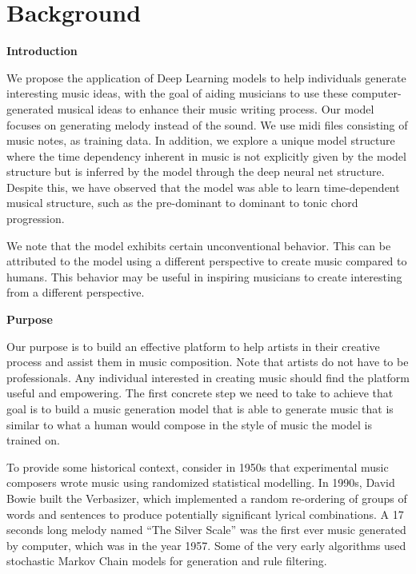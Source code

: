 \documentclass[12pt,oneside]{chicagocapstone}
\begin{document}
\hypertarget{background}{%
\chapter*{Background}\label{background}}

\textbf{Introduction}

We propose the application of Deep Learning models to help individuals generate interesting music ideas, with the goal of aiding musicians to use these computer-generated musical ideas to enhance their music writing process. Our model focuses on generating melody instead of the sound. We use midi files consisting of music notes, as training data. In addition, we explore a unique model structure where the time dependency inherent in music is not explicitly given by the model structure but is inferred by the model through the deep neural net structure. Despite this, we have observed that the model was able to learn time-dependent musical structure, such as the pre-dominant to dominant to tonic chord progression.

We note that the model exhibits certain unconventional behavior. This can be attributed to the model using a different perspective to create music compared to humans. This behavior may be useful in inspiring musicians to create interesting from a different perspective.

\textbf{Purpose}

Our purpose is to build an effective platform to help artists in their creative process and assist them in music composition. Note that artists do not have to be professionals. Any individual interested in creating music should find the platform useful and empowering. The first concrete step we need to take to achieve that goal is to build a music generation model that is able to generate music that is similar to what a human would compose in the style of music the model is trained on.

To provide some historical context, consider in 1950s that experimental music composers wrote music using randomized statistical modelling. In 1990s, David Bowie built the Verbasizer, which implemented a random re-ordering of groups of words and sentences to produce potentially significant lyrical combinations. A 17 seconds long melody named ``The Silver Scale'' was the first ever music generated by computer, which was in the year 1957. Some of the very early algorithms used stochastic Markov Chain models for generation and rule filtering.
\end{document}
